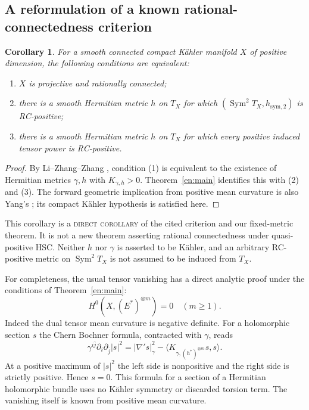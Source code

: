 \documentclass[12pt]{amsart}
\newtheorem{cor}[thm]{Corollary}
\theoremstyle{definition}
\theoremstyle{remark}
\numberwithin{equation}{section}
\DeclareMathOperator{\Sym}{Sym}
\theoremstyle{definition}
\begin{document}
\subsection{A reformulation of a known rational-connectedness criterion}
\begin{cor}\label{en:rcgeometry}
For a smooth connected compact K\"ahler manifold $X$ of positive dimension, the
following conditions are equivalent:
\begin{enumerate}
\item $X$ is projective and rationally connected;
\item there is a smooth Hermitian metric $h$ on $T_X$ for which
$(\Sym^2T_X,h_{\mathrm{sym},2})$ is RC-positive;
\item there is a smooth Hermitian metric $h$ on $T_X$ for which every
positive induced tensor power is RC-positive.
\end{enumerate}
\end{cor}
\begin{proof}
By Li--Zhang--Zhang \cite[Theorem 1.7]{en:LZZ}, condition (1) is
equivalent to the existence of Hermitian metrics $\gamma,h$ with
$K_{\gamma,h}>0$. Theorem~\ref{en:main} identifies this with (2)
and (3). The forward geometric implication from positive mean curvature
is also Yang's \cite[Corollary 1.5]{en:Yan18}; its compact K\"ahler
hypothesis is satisfied here.
\end{proof}
This corollary is a \textsc{direct corollary} of the cited criterion and
our fixed-metric theorem. It is not a new theorem asserting rational
connectedness under quasi-positive HSC. Neither $h$ nor $\gamma$ is
asserted to be K\"ahler, and an arbitrary RC-positive metric on
$\Sym^2T_X$ is not assumed to be induced from $T_X$.

For completeness, the usual tensor vanishing has a direct analytic proof
under the conditions of Theorem~\ref{en:main}:
\begin{equation}\label{en:vanishing}
 H^0(X,(E^*)^{\otimes m})=0\quad(m\geq1).
\end{equation}
Indeed the dual tensor mean curvature is negative definite. For a
holomorphic section $s$ the Chern Bochner formula, contracted with
$\gamma$, reads
\[
 \gamma^{i\bar j}\partial_i\partial_{\bar j}|s|^2
 =|\nabla' s|_\gamma^2-\langle K_{\gamma,(h^*)^{\otimes m}}s,s\rangle.
\]
At a positive maximum of $|s|^2$ the left side is nonpositive and the
right side is strictly positive. Hence $s=0$. This formula for a section
of a Hermitian holomorphic bundle uses no K\"ahler symmetry or discarded
torsion term. The vanishing itself is known from positive mean curvature.
\end{document}
